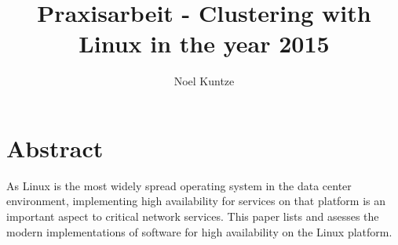 \documentclass[a4paper]{scrartcl}
\newcommand*\BlankPage{\newpage\null\thispagestyle{empty}\newpage}
\begin{document}
\title{Praxisarbeit - Clustering with Linux in the year 2015}
\author{Noel Kuntze }
\maketitle

\BlankPage

{}

\section*{Abstract}
As Linux is the most widely spread operating system in the data center environment,
implementing high availability for services on that platform is an important aspect to
critical network services. This paper lists and asesses the modern implementations
of software for high availability on the Linux platform.

\cleardoublepage
{}

\listoffigures

\cleardoublepage
\end{document}
